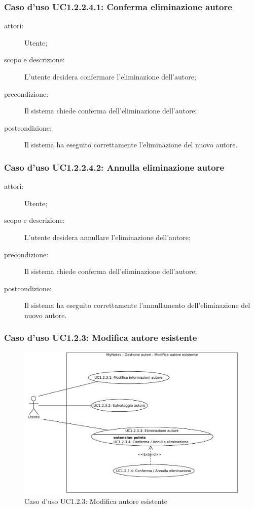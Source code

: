 \subsubsection{Caso d'uso UC1.2.2.4.1: Conferma eliminazione autore}
\begin{description}
\item[attori:] Utente;
\item[scopo e descrizione:] L'utente desidera confermare l'eliminazione dell'autore;
\item[precondizione:] Il sistema chiede conferma dell'eliminazione dell'autore;
\item[postcondizione:] Il sistema ha eseguito correttamente l'eliminazione del nuovo autore.
\end{description}

\subsubsection{Caso d'uso UC1.2.2.4.2: Annulla eliminazione autore}
\begin{description}
\item[attori:] Utente;
\item[scopo e descrizione:] L'utente desidera annullare l'eliminazione dell'autore;
\item[precondizione:] Il sistema chiede conferma dell'eliminazione dell'autore;
\item[postcondizione:] Il sistema ha eseguito correttamente l'annullamento dell'eliminazione del nuovo autore.
\end{description}

\subsubsection{Caso d'uso UC1.2.3: Modifica autore esistente}
\begin{figure}[htb]
\centering
\includegraphics[scale=0.5]{gfx/useCase/MN_UC1-2-3_Modifica_autore_esistente.pdf}
\caption{Caso d'uso UC1.2.3: Modifica autore esistente}
\label{fig:My notes UC1.2.3}
\end{figure}

